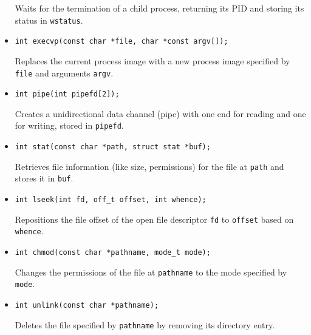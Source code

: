 \documentclass{article}
\begin{document}
\begin{itemize}
    Waits for the termination of a child process, returning its PID and storing its status in
    \texttt{wstatus}.

    \item \texttt{int execvp(const char *file, char *const argv[]);}
    
    Replaces the current process image with a new process image specified by \texttt{file} and
    arguments \texttt{argv}.

    \item \texttt{int pipe(int pipefd[2]);}
    
    Creates a unidirectional data channel (pipe) with one end for reading and one for writing,
    stored in \texttt{pipefd}.

    \item \texttt{int stat(const char *path, struct stat *buf);}
    
    Retrieves file information (like size, permissions) for the file at \texttt{path} and stores it
    in \texttt{buf}.

    \item \texttt{int lseek(int fd, off\_t offset, int whence);}
    
    Repositions the file offset of the open file descriptor \texttt{fd} to \texttt{offset} based on
    \texttt{whence}.

    \item \texttt{int chmod(const char *pathname, mode\_t mode);}
    
    Changes the permissions of the file at \texttt{pathname} to the mode specified by \texttt{mode}.

    \item \texttt{int unlink(const char *pathname);}
    
    Deletes the file specified by \texttt{pathname} by removing its directory entry.

\end{itemize}
\end{document}
